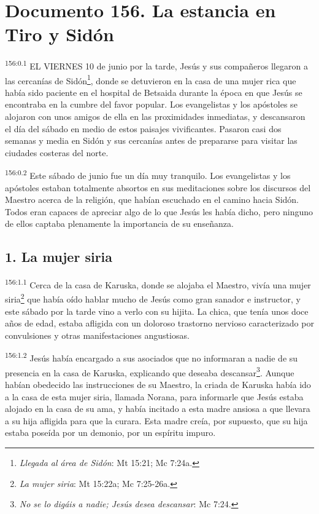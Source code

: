 \chapter{Documento 156. La estancia en Tiro y Sidón}
\par 
\textsuperscript{156:0.1} EL VIERNES 10 de junio por la tarde, Jesús y sus compañeros llegaron a las cercanías de Sidón\footnote{\textit{Llegada al área de Sidón}: Mt 15:21; Mc 7:24a.}, donde se detuvieron en la casa de una mujer rica que había sido paciente en el hospital de Betsaida durante la época en que Jesús se encontraba en la cumbre del favor popular. Los evangelistas y los apóstoles se alojaron con unos amigos de ella en las proximidades inmediatas, y descansaron el día del sábado en medio de estos paisajes vivificantes. Pasaron casi dos semanas y media en Sidón y sus cercanías antes de prepararse para visitar las ciudades costeras del norte.

\par 
\textsuperscript{156:0.2} Este sábado de junio fue un día muy tranquilo. Los evangelistas y los apóstoles estaban totalmente absortos en sus meditaciones sobre los discursos del Maestro acerca de la religión, que habían escuchado en el camino hacia Sidón. Todos eran capaces de apreciar algo de lo que Jesús les había dicho, pero ninguno de ellos captaba plenamente la importancia de su enseñanza.

\section*{1. La mujer siria}
\par 
\textsuperscript{156:1.1} Cerca de la casa de Karuska, donde se alojaba el Maestro, vivía una mujer siria\footnote{\textit{La mujer siria}: Mt 15:22a; Mc 7:25-26a.} que había oído hablar mucho de Jesús como gran sanador e instructor, y este sábado por la tarde vino a verlo con su hijita. La chica, que tenía unos doce años de edad, estaba afligida con un doloroso trastorno nervioso caracterizado por convulsiones y otras manifestaciones angustiosas.

\par 
\textsuperscript{156:1.2} Jesús había encargado a sus asociados que no informaran a nadie de su presencia en la casa de Karuska, explicando que deseaba descansar\footnote{\textit{No se lo digáis a nadie; Jesús desea descansar}: Mc 7:24.}. Aunque habían obedecido las instrucciones de su Maestro, la criada de Karuska había ido a la casa de esta mujer siria, llamada Norana, para informarle que Jesús estaba alojado en la casa de su ama, y había incitado a esta madre ansiosa a que llevara a su hija afligida para que la curara. Esta madre creía, por supuesto, que su hija estaba poseída por un demonio, por un espíritu impuro.


